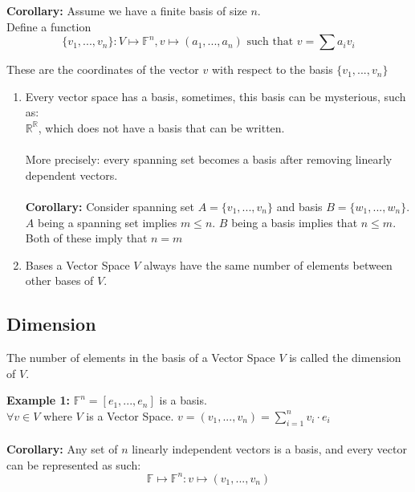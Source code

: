\documentclass[12pt]{article}
\begin{document}
\textbf{Corollary:} Assume we have a finite basis of size $n$.\\
Define a function
$$\{v_1, ..., v_n \} : V \mapsto \mathbb{F}^n, v \mapsto (a_1, ... , a_n) \text{ such that } v = \sum a_i v_i$$

These are the coordinates of the vector $v$ with respect to the basis $\{v_1, ..., v_n \}$

\begin{enumerate}
	\item{
	Every vector space has a basis, sometimes, this basis can be mysterious, such as:\\
	$\mathbb{R}^{\mathbb{R}}$, which does not have a basis that can be written.\\
	\\
	More precisely: every spanning set becomes a basis after removing linearly dependent vectors.\\
	\\
	\textbf{Corollary:} Consider spanning set $A = \{ v_1, ... ,v_n \}$ and basis $B = \{w_1, ..., w_n \}$.\\
	$A$ being a spanning set implies $m \leq n$. $B$ being a basis implies that $n \leq m$. Both of these imply that $n=m$
	}
	\item{
	Bases a Vector Space $V$ always have the same number of elements between other bases of $V$.
	}
\end{enumerate}

\subsection{Dimension}

\begin{tcolorbox}[title=Definition: Dimension]
	The number of elements in the basis of a Vector Space $V$ is called the dimension of $V$.
\end{tcolorbox}

\textbf{Example 1:} $\mathbb{F}^n = [e_1, ..., e_n]$ is a basis.\\
$\forall v\in V$ where $V$ is a Vector Space. $v = (v_1, ... , v_n) = \sum^n_{i=1} v_i\cdot e_i$\\
\\
\textbf{Corollary:} Any set of $n$ linearly independent vectors is a basis, and every vector can be represented as such:
$$\mathbb{F}\mapsto\mathbb{F}^n : v \mapsto (v_1, ..., v_n)$$
\end{document}
